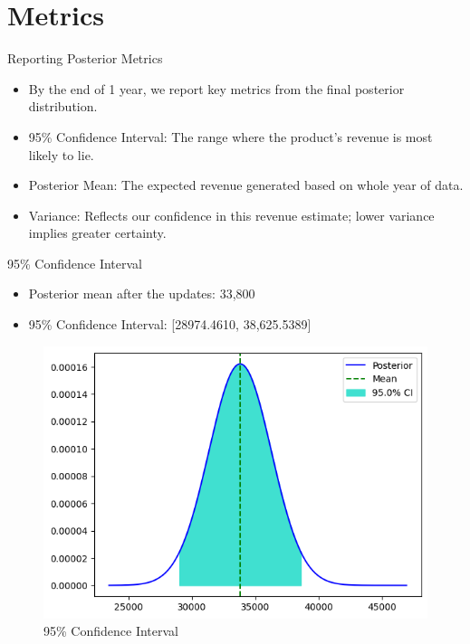 \section{Metrics}

\begin{frame}{Reporting Posterior Metrics}

\begin{itemize}
  \item By the end of 1 year, we report key metrics from the final posterior distribution.
  \item 95\% Confidence Interval: The range where the product's revenue is most likely to lie.
  \item Posterior Mean: The expected revenue generated based on whole year of data.
  \item Variance: Reflects our confidence in this revenue estimate; lower variance implies greater certainty.
\end{itemize}

\end{frame}

\begin{frame}{95\% Confidence Interval}

\begin{itemize}
  \item Posterior mean after the updates: 33,800
  \item 95\% Confidence Interval: [28974.4610, 38,625.5389]
\end{itemize}

\begin{figure}
  \centering
  \includegraphics[width=.8\linewidth]{../Report/images/ci.png}
  \caption{95\% Confidence Interval}
\end{figure}
  
\end{frame}

